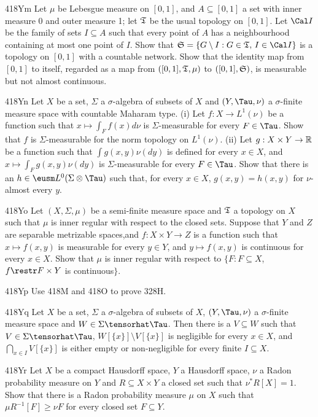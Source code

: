 {\spheader 418Ym Let $\mu$ be Lebesgue measure on $[0,1]$, and
$A\subseteq[0,1]$ a set with inner measure 0 and outer measure 1;  let
$\frak T$ be the usual topology on $[0,1]$.   Let $\Cal I$ be the family
of sets $I\subseteq A$ such that every point of $A$ has a neighbourhood
containing at most one point of $I$.   Show that
$\frak S=\{G\setminus I:G\in\frak T,\,I\in\Cal I\}$ is a topology on
$[0,1]$ with a countable network.   Show that the identity map from
$[0,1]$ to itself, regarded as a map from $([0,1],\frak T,\mu)$ to
$([0,1],\frak S)$, is measurable but not almost continuous.

\spheader 418Yn Let $X$ be a set, $\Sigma$ a $\sigma$-algebra of subsets of
$X$ and $(Y,\Tau,\nu)$ a $\sigma$-finite measure space with countable
Maharam type.   (i) Let $f:X\to L^1(\nu)$ be a function such that
$x\mapsto\int_Ff(x)d\nu$ is $\Sigma$-measurable for every $F\in\Tau$.
Show that $f$ is $\Sigma$-measurable for the norm topology on $L^1(\nu)$.
(ii) Let $g:X\times Y\to\Bbb R$ be a function such that
$\int g(x,y)\nu(dy)$ is defined for every $x\in X$, and
$x\mapsto\int_Fg(x,y)\nu(dy)$ is $\Sigma$-measurable for every $F\in\Tau$.
Show that there is an $h\in\eusm L^0(\Sigma\otimes\Tau)$ such that, for
every $x\in X$, $g(x,y)=h(x,y)$ for $\nu$-almost every $y$.

\spheader 418Yo Let $(X,\Sigma,\mu)$ be a semi-finite measure
space and $\frak T$ a topology on $X$ such that $\mu$ is inner regular
with respect to the closed sets.   Suppose that $Y$ and $Z$ are
separable metrizable spaces,and
$f:X\times Y\to Z$ is a function such that $x\mapsto f(x,y)$ is measurable
for every $y\in Y$, and $y\mapsto f(x,y)$ is continuous for every $x\in X$.
Show that $\mu$ is inner regular
with respect to $\{F:F\subseteq X$, $f\restr F\times Y$ is continuous$\}$.

\spheader 418Yp
Use 418M and 418O to prove 328H.

\spheader 418Yq
Let $X$ be a set, $\Sigma$ a $\sigma$-algebra of
subsets of $X$, $(Y,\Tau,\nu)$ a $\sigma$-finite measure space and
$W\in\Sigma\tensorhat\Tau$.   Then there is a $V\subseteq W$ such that
$V\in\Sigma\tensorhat\Tau$, $W[\{x\}]\setminus V[\{x\}]$ is negligible
for every
$x\in X$, and $\bigcap_{x\in I}V[\{x\}]$ is either empty or non-negligible
for every finite $I\subseteq X$.

\spheader 418Yr
Let $X$ be a compact Hausdorff space, $Y$ a Hausdorff space, $\nu$ a
Radon probability measure on $Y$ and $R\subseteq X\times Y$ a closed set 
such that $\nu^*R[X]=1$.   Show that there is a Radon 
probability measure $\mu$ on $X$ such that
$\mu R^{-1}[F]\ge\nu F$ for every closed set $F\subseteq Y$.
}%

